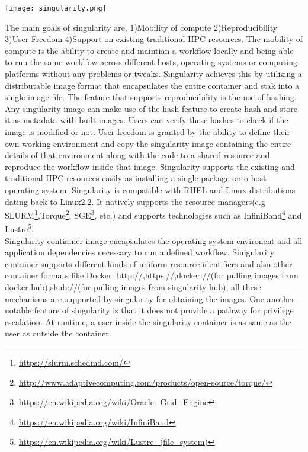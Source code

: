 \begin{center}
\texttt{[image: singularity.png]}
\label{fig:singularity_workflow}
\end{center}


The main goals of singularity are, 1)Mobility of compute 2)Reproducibility 3)User Freedom 4)Support on existing traditional HPC resources. The mobility of compute is the ability to create and maintian a workflow locally and being able to run the same worklfow across different hosts, operating systems or computing platforms without any problems or tweaks. Singularity achieves this by utilizing a distributable image format that encapsulates the entire container and stak into a single image file. The feature that supports reproducibility is the use of hashing. Any singularity image can make use of the hash feature to create hash and store it as metadata with built images. Users can verify these hashes to check if the image is modified or not. User freedom is granted by the ability to define their own working environment and copy the singularity image containing the entire details of that environment along with the code to a shared resource and reproduce the workflow inside that image. Singularity supports the existing and traditional HPC resources easily as installing a single package onto host operating system. Singularity is compatible with RHEL and Linux distributions dating back to Linux2.2. It natively supports the resource managers(e.g SLURM\footnote{\url{https://slurm.schedmd.com/}},Torque\footnote{\url{http://www.adaptivecomputing.com/products/open-source/torque/}}, SGE\footnote{\url{https://en.wikipedia.org/wiki/Oracle_Grid_Engine}}, etc.) and supports technologies such as InfiniBand\footnote{\url{https://en.wikipedia.org/wiki/InfiniBand}} and Lustre\footnote{\url{https://en.wikipedia.org/wiki/Lustre_(file_system)}}.\\

Singularity contiainer image encapsulates the operating system environent and all application dependencies necessary to run a defined workflow. Sinigularity container supports different kinds of uniform resource identifiers and also other container formats like Docker. http://,https://,docker://(for pulling images from docker hub),shub://(for pulling images from singularity hub), all these mechanisms are supported by singularity for obtaining the images. One another notable feature of singularity is that it does not provide a pathway for privilege escalation. At runtime, a user inside the singularity container is as same as the user as outside the container.
 
